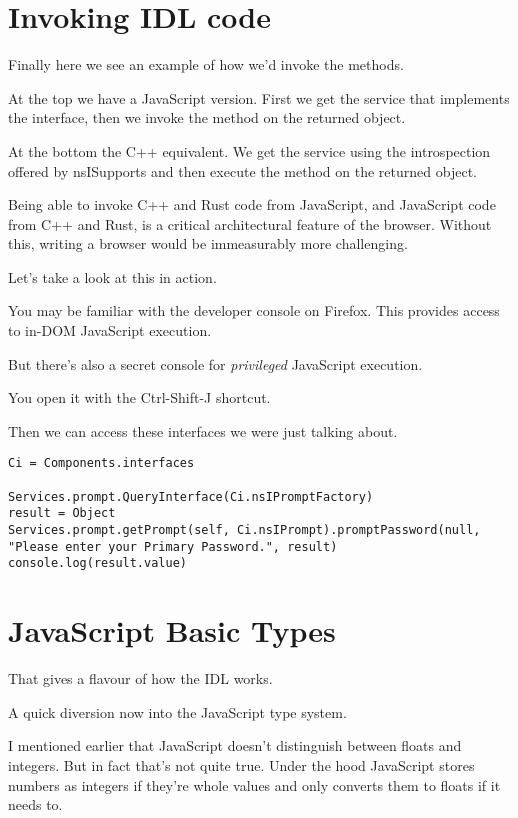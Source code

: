 \documentclass{article}
\begin{document}
\section{Invoking IDL code}

Finally here we see an example of how we'd invoke the methods.

At the top we have a JavaScript version. First we get the service that implements the interface, then we invoke the method on the returned object.

At the bottom the C++ equivalent. We get the service using the introspection offered by {\code nsISupports} and then execute the method on the returned object.

Being able to invoke C++ and Rust code from JavaScript, and JavaScript code from C++ and Rust, is a critical architectural feature of the browser. Without this, writing a browser would be immeasurably more challenging.

Let's take a look at this in action.

You may be familiar with the developer console on Firefox. This provides access to in-DOM JavaScript execution.

But there's also a secret console for {\it privileged\/} JavaScript execution.

You open it with the {\code Ctrl-Shift-J} shortcut.

Then we can access these interfaces we were just talking about.

\begin{verbatim}
Ci = Components.interfaces

Services.prompt.QueryInterface(Ci.nsIPromptFactory)
result = Object
Services.prompt.getPrompt(self, Ci.nsIPrompt).promptPassword(null, "Please enter your Primary Password.", result)
console.log(result.value)
\end{verbatim}


\section{JavaScript Basic Types}

That gives a flavour of how the IDL works.

A quick diversion now into the JavaScript type system.

I mentioned earlier that JavaScript doesn't distinguish between floats and integers. But in fact that's not quite true. Under the hood JavaScript stores numbers as integers if they're whole values and only converts them to floats if it needs to.
\end{document}
